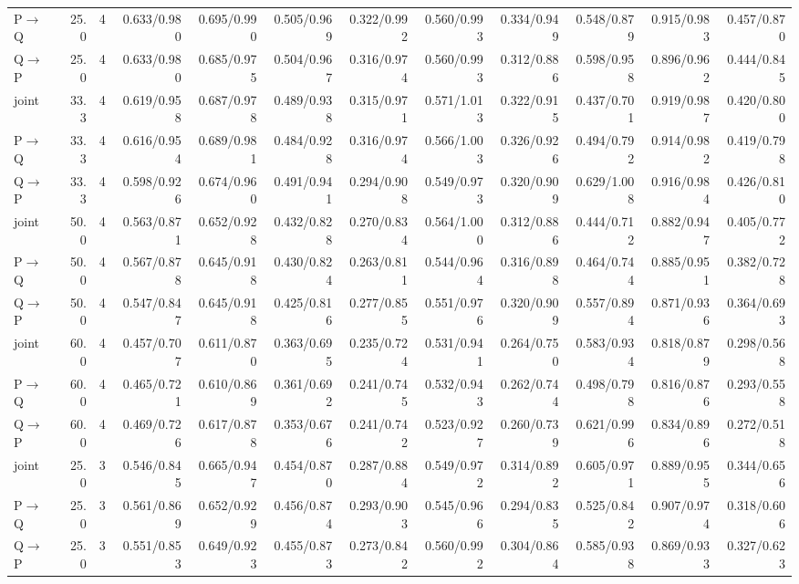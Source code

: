 \documentclass{article}
\begin{document}
\begin{longtable}{lrrrrrrrrrrr}
P$\to$Q & 25.0 & 4 & 0.633/0.980 & 0.695/0.990 & 0.505/0.969 & 0.322/0.992 & 0.560/0.993 & 0.334/0.949 & 0.548/0.879 & 0.915/0.983 & 0.457/0.870 \\
Q$\to$P & 25.0 & 4 & 0.633/0.980 & 0.685/0.975 & 0.504/0.967 & 0.316/0.974 & 0.560/0.993 & 0.312/0.886 & 0.598/0.958 & 0.896/0.962 & 0.444/0.845 \\
joint & 33.3 & 4 & 0.619/0.958 & 0.687/0.978 & 0.489/0.938 & 0.315/0.971 & 0.571/1.013 & 0.322/0.915 & 0.437/0.701 & 0.919/0.987 & 0.420/0.800 \\
P$\to$Q & 33.3 & 4 & 0.616/0.954 & 0.689/0.981 & 0.484/0.928 & 0.316/0.974 & 0.566/1.003 & 0.326/0.926 & 0.494/0.792 & 0.914/0.982 & 0.419/0.798 \\
Q$\to$P & 33.3 & 4 & 0.598/0.926 & 0.674/0.960 & 0.491/0.941 & 0.294/0.908 & 0.549/0.973 & 0.320/0.909 & 0.629/1.008 & 0.916/0.984 & 0.426/0.810 \\
joint & 50.0 & 4 & 0.563/0.871 & 0.652/0.928 & 0.432/0.828 & 0.270/0.834 & 0.564/1.000 & 0.312/0.886 & 0.444/0.712 & 0.882/0.947 & 0.405/0.772 \\
P$\to$Q & 50.0 & 4 & 0.567/0.878 & 0.645/0.918 & 0.430/0.824 & 0.263/0.811 & 0.544/0.964 & 0.316/0.898 & 0.464/0.744 & 0.885/0.951 & 0.382/0.728 \\
Q$\to$P & 50.0 & 4 & 0.547/0.847 & 0.645/0.918 & 0.425/0.816 & 0.277/0.855 & 0.551/0.976 & 0.320/0.909 & 0.557/0.894 & 0.871/0.936 & 0.364/0.693 \\
joint & 60.0 & 4 & 0.457/0.707 & 0.611/0.870 & 0.363/0.695 & 0.235/0.724 & 0.531/0.941 & 0.264/0.750 & 0.583/0.934 & 0.818/0.879 & 0.298/0.568 \\
P$\to$Q & 60.0 & 4 & 0.465/0.721 & 0.610/0.869 & 0.361/0.692 & 0.241/0.745 & 0.532/0.943 & 0.262/0.744 & 0.498/0.798 & 0.816/0.876 & 0.293/0.558 \\
Q$\to$P & 60.0 & 4 & 0.469/0.726 & 0.617/0.878 & 0.353/0.676 & 0.241/0.742 & 0.523/0.927 & 0.260/0.739 & 0.621/0.996 & 0.834/0.896 & 0.272/0.518 \\
joint & 25.0 & 3 & 0.546/0.845 & 0.665/0.947 & 0.454/0.870 & 0.287/0.884 & 0.549/0.972 & 0.314/0.892 & 0.605/0.971 & 0.889/0.955 & 0.344/0.656 \\
P$\to$Q & 25.0 & 3 & 0.561/0.869 & 0.652/0.929 & 0.456/0.874 & 0.293/0.903 & 0.545/0.966 & 0.294/0.835 & 0.525/0.842 & 0.907/0.974 & 0.318/0.606 \\
Q$\to$P & 25.0 & 3 & 0.551/0.853 & 0.649/0.923 & 0.455/0.873 & 0.273/0.842 & 0.560/0.992 & 0.304/0.864 & 0.585/0.938 & 0.869/0.933 & 0.327/0.623 \\

\end{longtable}
\end{document}
